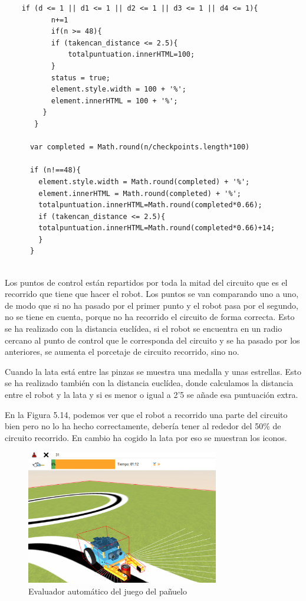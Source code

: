 \begin{lstlisting}
	if (d <= 1 || d1 <= 1 || d2 <= 1 || d3 <= 1 || d4 <= 1){
	       n+=1
	       if(n >= 48){
		   if (takencan_distance <= 2.5){
		       totalpuntuation.innerHTML=100;
		   }
		   status = true;
		   element.style.width = 100 + '%';
		   element.innerHTML = 100 + '%';
	     }
	   }
	  
	  var completed = Math.round(n/checkpoints.length*100)
	  
	  if (n!==48){
	    element.style.width = Math.round(completed) + '%';
	    element.innerHTML = Math.round(completed) + '%';
	    totalpuntuation.innerHTML=Math.round(completed*0.66);
	    if (takencan_distance <= 2.5){
		totalpuntuation.innerHTML=Math.round(completed*0.66)+14;
	    }
	  }
    
\end{lstlisting}

Los puntos de control están repartidos por toda la mitad del circuito que es el recorrido que tiene que hacer el robot. Los puntos se van comparando uno a uno, de modo que si no ha pasado por el primer punto y el robot pasa por el segundo, no se tiene en cuenta, porque no ha recorrido el circuito de forma correcta. Esto se ha realizado con la distancia euclídea, si el robot se encuentra en un radio cercano al punto de control que le corresponda del circuito y se ha pasado por los anteriores, se aumenta el porcetaje de circuito recorrido, sino no.

Cuando la lata está entre las pinzas se muestra una medalla y unas estrellas. Esto se ha realizado también con la distancia euclídea, donde calculamos la distancia entre el robot y la lata y si es menor o igual a 2'5 se añade esa puntuación extra.

En la Figura 5.14, podemos ver que el robot a recorrido una parte del circuito bien pero no lo ha hecho correctamente, debería tener al rededor del  50\% de circuito recorrido. En cambio ha cogido la lata por eso se muestran los iconos.

 \begin{figure}[H]
  \centering
 \includegraphics[width=0.75\textwidth, height=0.45\textwidth]{chapters/images/evaluadorpinza.png}
  \caption{Evaluador automático del juego del pañuelo}
\end{figure}



